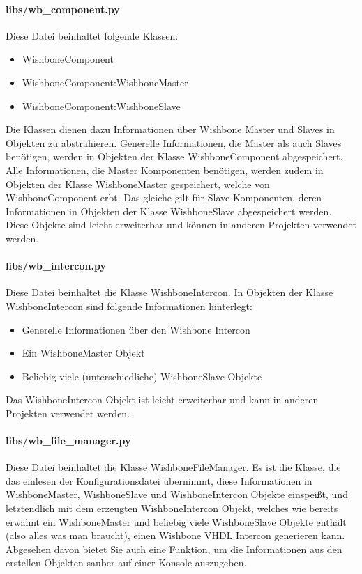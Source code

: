 \documentclass{article}
\newcommand{\nl}{\leavevmode\newline}
\begin{document}
\paragraph{libs/wb\_component.py}\nl
Diese Datei beinhaltet folgende Klassen:
\begin{itemize}
\item WishboneComponent
\item WishboneComponent:WishboneMaster
\item WishboneComponent:WishboneSlave
\end{itemize}
Die Klassen dienen dazu Informationen über Wishbone Master und Slaves in Objekten zu abstrahieren.
Generelle Informationen, die Master als auch Slaves benötigen, werden in Objekten der Klasse WishboneComponent abgespeichert. Alle Informationen, die Master Komponenten benötigen, werden zudem in Objekten der Klasse WishboneMaster gespeichert, welche von WishboneComponent erbt. Das gleiche gilt für Slave Komponenten, deren Informationen in Objekten der Klasse WishboneSlave abgespeichert werden. Diese Objekte sind leicht erweiterbar und können in anderen Projekten verwendet werden.
\paragraph{libs/wb\_intercon.py}\nl
Diese Datei beinhaltet die Klasse WishboneIntercon. In Objekten der Klasse WishboneIntercon sind folgende Informationen hinterlegt:
\begin{itemize}
\item Generelle Informationen über den Wishbone Intercon
\item Ein WishboneMaster Objekt
\item Beliebig viele (unterschiedliche) WishboneSlave Objekte
\end{itemize}
Das WishboneIntercon Objekt ist leicht erweiterbar und kann in anderen Projekten verwendet werden.
\paragraph{libs/wb\_file\_manager.py}\nl 
Diese Datei beinhaltet die Klasse WishboneFileManager. Es ist die Klasse, die das einlesen der Konfigurationsdatei übernimmt, diese Informationen in WishboneMaster, WishboneSlave und WishboneIntercon Objekte einspeißt, und letztendlich mit dem erzeugten WishboneIntercon Objekt, welches wie bereits erwähnt ein WishboneMaster und beliebig viele WishboneSlave Objekte enthält (also alles was man braucht), einen Wishbone VHDL Intercon generieren kann. Abgesehen davon bietet Sie auch eine Funktion, um die Informationen aus den erstellen Objekten sauber auf einer Konsole auszugeben.
\end{document}
